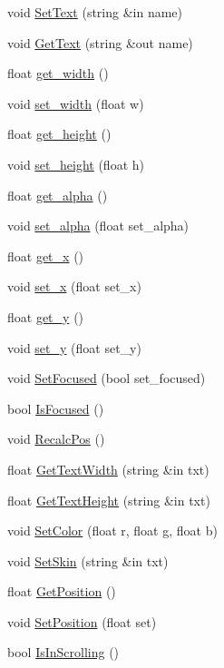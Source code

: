 \begin{DoxyCompactItemize}
\item 
void \hyperlink{class_g_u_i_scroller_aa420514e8de086c05710bad0af31b07c}{Set\+Text} (string \&in name)
\item 
void \hyperlink{class_g_u_i_scroller_a5dec94428de712b7f728f3e3d5f1dea6}{Get\+Text} (string \&out name)
\item 
float \hyperlink{class_g_u_i_scroller_a853c12d4b8f7d31c37f75d8d6c39db68}{get\+\_\+width} ()
\item 
void \hyperlink{class_g_u_i_scroller_af3bc0899bd60c4ed343b61e85b534d49}{set\+\_\+width} (float w)
\item 
float \hyperlink{class_g_u_i_scroller_ad5166bdbe1841d02d90b6e74e4bf2586}{get\+\_\+height} ()
\item 
void \hyperlink{class_g_u_i_scroller_a3c2b983e77ed29755daf09fde2d8b0cc}{set\+\_\+height} (float h)
\item 
float \hyperlink{class_g_u_i_scroller_a56e02aa89a92bc45028f381737872f80}{get\+\_\+alpha} ()
\item 
void \hyperlink{class_g_u_i_scroller_a7372e6331db0508eb10a8bd07899b8f5}{set\+\_\+alpha} (float set\+\_\+alpha)
\item 
float \hyperlink{class_g_u_i_scroller_ad61c9e0e6a5ea89ace8a8ac2e70d2887}{get\+\_\+x} ()
\item 
void \hyperlink{class_g_u_i_scroller_a1ac31bd416b07f2eab1ec4f3ecf57544}{set\+\_\+x} (float set\+\_\+x)
\item 
float \hyperlink{class_g_u_i_scroller_a4c9280af256fa20b121bbfa686e1dcc0}{get\+\_\+y} ()
\item 
void \hyperlink{class_g_u_i_scroller_a443a8a0e2b343f18b8e3929fdb21a6d6}{set\+\_\+y} (float set\+\_\+y)
\item 
void \hyperlink{class_g_u_i_scroller_aea722d6f5ce2ea94ed3710101871410c}{Set\+Focused} (bool set\+\_\+focused)
\item 
bool \hyperlink{class_g_u_i_scroller_a90456ec21d36e48ca5f640530afb2ece}{Is\+Focused} ()
\item 
void \hyperlink{class_g_u_i_scroller_acbaf8ba05df2a262692e654221885df5}{Recalc\+Pos} ()
\item 
float \hyperlink{class_g_u_i_scroller_a950a3d1f118bcf2466e7a31d7bf487df}{Get\+Text\+Width} (string \&in txt)
\item 
float \hyperlink{class_g_u_i_scroller_a74dda26509c77ae897afb325074b997e}{Get\+Text\+Height} (string \&in txt)
\item 
void \hyperlink{class_g_u_i_scroller_aeb74c7335c4ae5e73a96bf42e1d0910e}{Set\+Color} (float r, float g, float b)
\item 
void \hyperlink{class_g_u_i_scroller_a64489d631fb6a8cfb76b3f64d3a38b13}{Set\+Skin} (string \&in txt)
\item 
float \hyperlink{class_g_u_i_scroller_a80f7328b7995d2a9f786a5ffa535f2e1}{Get\+Position} ()
\item 
void \hyperlink{class_g_u_i_scroller_ad7215df95da44cc0c889016a3a199724}{Set\+Position} (float set)
\item 
bool \hyperlink{class_g_u_i_scroller_ac3d346b2822a88a08f8a0644289214ac}{Is\+In\+Scrolling} ()
\end{DoxyCompactItemize}
